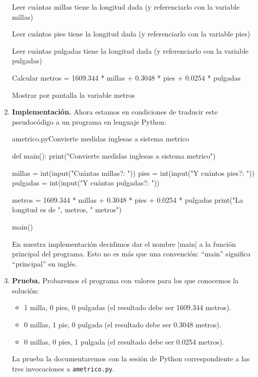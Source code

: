 \begin{enumerate}
\begin{codigo-nohl-sn}
Leer cuántas millas tiene la longitud dada
 (y referenciarlo con la variable millas)

Leer cuántos pies tiene la longitud dada
 (y referenciarlo con la variable pies)

Leer cuántas pulgadas tiene la longitud dada
 (y referenciarlo con la variable pulgadas)

Calcular metros = 1609.344 * millas +
    0.3048 * pies + 0.0254 * pulgadas

Mostrar por pantalla la variable metros
\end{codigo-nohl-sn}

\item {\bf Implementación.} Ahora estamos en condiciones de
traducir este pseudocódigo a un programa en lenguaje Python:

\begin{codigo}{ametrico.py}{Convierte medidas inglesas a sistema metrico}
\begin{codigo-python}
def main():
    print("Convierte medidas inglesas a sistema metrico")

    millas = int(input("Cuántas millas?: "))
    pies = int(input("Y cuántos pies?: "))
    pulgadas = int(input("Y cuántas pulgadas?: "))

    metros = 1609.344 * millas + 0.3048 * pies + 0.0254 * pulgadas
    print("La longitud es de ", metros, " metros")

main()
\end{codigo-python}
\end{codigo}

\begin{nota}
En nuestra implementación decidimos dar el nombre |main| a la función principal
del programa. Esto no es más que una convención: ``main'' significa
``principal'' en inglés.
\end{nota}

\item {\bf Prueba.} Probaremos el programa con valores para los que conocemos
la solución:

\begin{itemize}
\item 1 milla, 0 pies, 0 pulgadas (el resultado debe ser 1609.344 metros).
\item 0 millas, 1 pie, 0 pulgada (el resultado debe ser 0.3048 metros).
\item 0 millas, 0 pies, 1 pulgada (el resultado debe ser 0.0254 metros).
\end{itemize}

La prueba la documentaremos con la sesión de Python
correspondiente a las tres invocaciones a \lstinline!ametrico.py!.
\end{enumerate}


